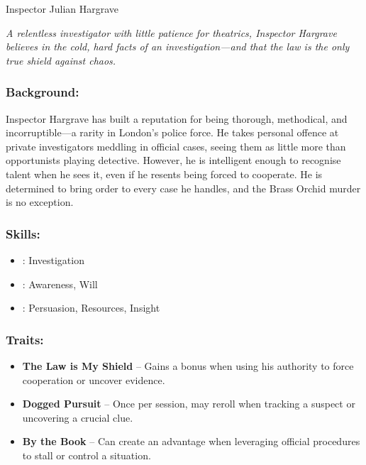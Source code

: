 \begin{WyrdFullNPC}[%
		name=Inspector Julian Hargrave,%
		description=By-the-Book Investigator,%
		float=!t%
	]{Inspector Julian Hargrave}
	
    \emph{A relentless investigator with little patience for theatrics, Inspector Hargrave believes in the cold, hard facts of an investigation—and that the law is the only true shield against chaos.}
    
    \subsubsection*{Background:}
    Inspector Hargrave has built a reputation for being thorough, methodical, and incorruptible—a rarity in London’s police force. He takes personal offence at private investigators meddling in official cases, seeing them as little more than opportunists playing detective. However, he is intelligent enough to recognise talent when he sees it, even if he resents being forced to cooperate. He is determined to bring order to every case he handles, and the Brass Orchid murder is no exception.

    \subsubsection*{Skills:}
    \begin{itemize}
       \item \Expert: Investigation
        \item \Skilled: Awareness, Will
        \item \Novice: Persuasion, Resources, Insight
    \end{itemize}
    
    \subsubsection*{Traits:}
    \begin{itemize}
        \item \textbf{The Law is My Shield} – Gains a bonus when using his authority to force cooperation or uncover evidence.
        \item \textbf{Dogged Pursuit} – Once per session, may reroll when tracking a suspect or uncovering a crucial clue.
        \item \textbf{By the Book} – Can create an advantage when leveraging official procedures to stall or control a situation.
    \end{itemize}
\end{WyrdFullNPC}


